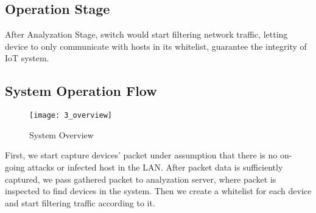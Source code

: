 \subsection{Operation Stage}
After Analyzation Stage, switch would start filtering network traffic, letting device to only communicate with hosts in its whitelist, guarantee the integrity of IoT system. 

\subsection{System Operation Flow}
\begin{figure}[h]
    \centering 
    \texttt{[image: 3\_overview]}
    \caption{System Overview}
    \label{fig:s3_system_overview}
\end{figure}

First, we start capture devices’ packet under assumption that there is no on-going attacks or infected host in the LAN. After packet data is sufficiently captured, we pass gathered packet to analyzation server, where packet is inspected to find devices in the system. Then we create a whitelist for each device and start filtering traffic according to it. 